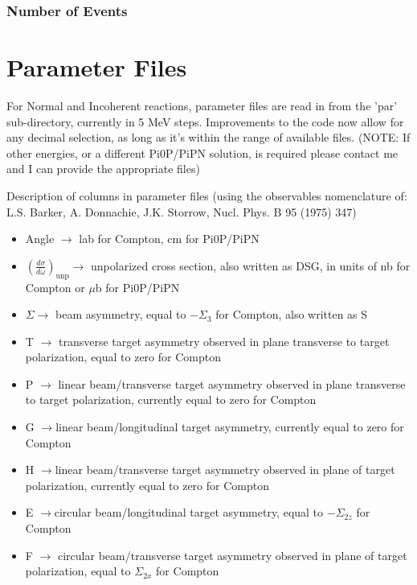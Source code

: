 \documentclass[twoside,letterpaper,12pt]{article}
\begin{document}
\subsubsection{Number of Events}

\section{Parameter Files}
For Normal and Incoherent reactions, parameter files are read in from the 'par' sub-directory, currently in 5 MeV steps. Improvements to the code now allow for any decimal selection, as long as it's within the range of available files. (NOTE: If other energies, or a different Pi0P/PiPN solution, is required please contact me and I can provide the appropriate files)

Description of columns in parameter files (using the observables nomenclature of: L.S. Barker, A. Donnachie, J.K. Storrow, Nucl. Phys. B 95 (1975) 347)
\begin{itemize}
\item Angle $\rightarrow$ lab for Compton, cm for Pi0P/PiPN
\item $\left(\frac{d\sigma}{d\omega}\right)_{\mathrm{unp}}\rightarrow$ unpolarized cross section, also written as DSG, in units of nb for Compton or $\mu$b for Pi0P/PiPN
\item $\Sigma\rightarrow$ beam asymmetry, equal to $-\Sigma_{3}$ for Compton, also written as S
\item T $\rightarrow$ transverse target asymmetry observed in plane transverse to target polarization, equal to zero for Compton
\item P $\rightarrow$ linear beam/transverse target asymmetry observed in plane transverse to target polarization, currently equal to zero for Compton
\item G  $\rightarrow$linear beam/longitudinal target asymmetry, currently equal to zero for Compton
\item H  $\rightarrow$linear beam/transverse target asymmetry observed in plane of target polarization, currently equal to zero for Compton
\item E  $\rightarrow$circular beam/longitudinal target asymmetry, equal to $-\Sigma_{2z}$ for Compton
\item F $\rightarrow$ circular beam/transverse target asymmetry observed in plane of target polarization, equal to $\Sigma_{2x}$ for Compton
\end{itemize}
\end{document}
